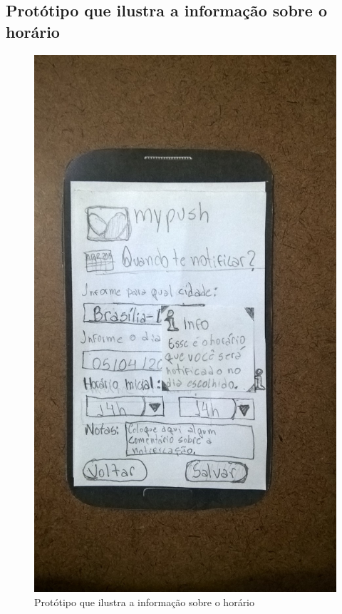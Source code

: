 \begin{apendicesenv}
  \pagebreak
  \section*{Protótipo que ilustra a informação sobre o horário}

    \begin{figure}[!htbp]
      \centering
      \includegraphics[scale=0.32, angle=-90]{editaveis/figuras/prototipo_papel_v2/quando_notificar_info_horario}
      \caption{Protótipo que ilustra a informação sobre o horário}
      \label{quando_notificar_info_horario_v2}
    \end{figure}
    

\end{apendicesenv}
